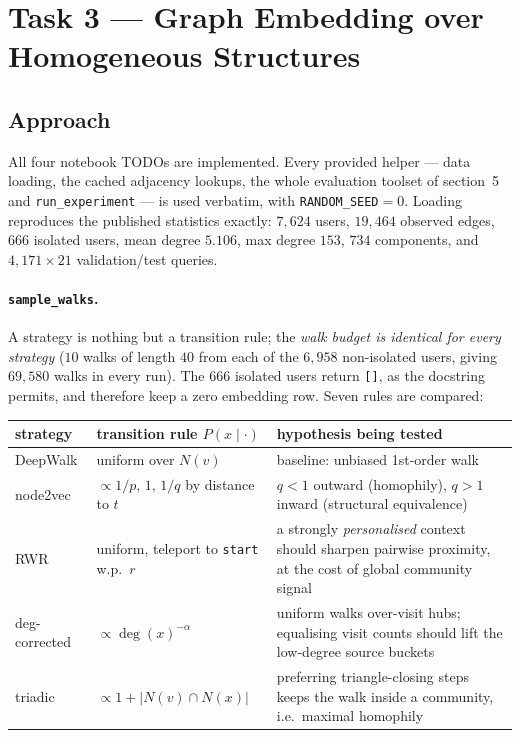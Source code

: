 \section{Task 3 --- Graph Embedding over Homogeneous Structures}
\label{p1:sec:main}

\subsection{Approach}
\label{p1:sec:approach}

All four notebook TODOs are implemented.  Every provided helper --- data loading, the
cached adjacency lookups, the whole evaluation toolset of section~5 and
\texttt{run\_experiment} --- is used verbatim, with \texttt{RANDOM\_SEED}${}=0$.
Loading reproduces the published statistics exactly:
$7{,}624$ users, $19{,}464$ observed edges, $666$ isolated users, mean degree $5.106$,
max degree $153$, $734$ components, and $4{,}171\times 21$ validation/test queries.

\paragraph{\texttt{sample\_walks}.}
A strategy is nothing but a transition rule; the \emph{walk budget is identical for every
strategy} ($10$ walks of length $40$ from each of the $6{,}958$ non-isolated users, giving
$69{,}580$ walks in every run).  The $666$ isolated users return \texttt{[]}, as the
docstring permits, and therefore keep a zero embedding row.  Seven rules are compared:

\begin{center}\small
\begin{tabular}{@{}llp{6.6cm}@{}}
\toprule
strategy & transition rule $P(x \mid \cdot)$ & hypothesis being tested \\
\midrule
DeepWalk & uniform over $N(v)$ & baseline: unbiased 1st-order walk \\
node2vec & $\propto 1/p,\,1,\,1/q$ by distance to $t$ & $q<1$ outward (homophily), $q>1$ inward (structural equivalence) \\
RWR & uniform, teleport to \texttt{start} w.p.\ $r$ & a strongly \emph{personalised} context should sharpen pairwise proximity, at the cost of global community signal \\
deg-corrected & $\propto \deg(x)^{-\alpha}$ & uniform walks over-visit hubs; equalising visit counts should lift the low-degree source buckets \\
triadic & $\propto 1 + |N(v)\cap N(x)|$ & preferring triangle-closing steps keeps the walk inside a community, i.e.\ maximal homophily \\
\bottomrule
\end{tabular}
\end{center}

